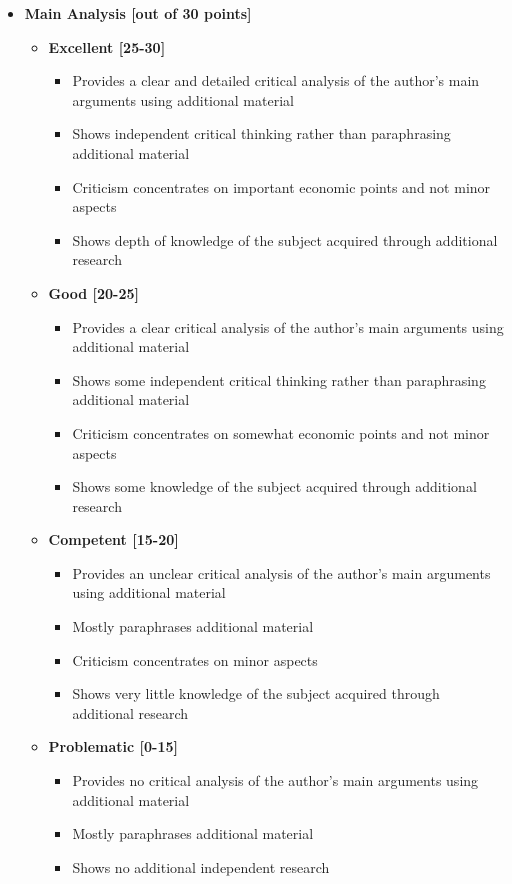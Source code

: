 \documentclass[letterpaper,12pt]{article}
\theoremstyle{dotlessS}
\begin{document}
\begin{itemize}
\item \textbf{Main Analysis [out of 30 points]}
\begin{itemize}
\item \textbf{Excellent [25-30]}
\begin{itemize}
\item Provides a clear and detailed critical analysis of the author's main arguments using additional material
\item Shows independent critical thinking rather than paraphrasing additional material    
\item Criticism concentrates on important economic points and not minor aspects
\item Shows depth of knowledge of the subject acquired through additional research
\end{itemize}
\item \textbf{Good [20-25]}
\begin{itemize}
\item Provides a clear critical analysis of the author's main arguments using additional material
\item Shows some independent critical thinking rather than paraphrasing additional material    
\item Criticism concentrates on somewhat economic points and not minor aspects
\item Shows some knowledge of the subject acquired through additional research
\end{itemize}
\item \textbf{Competent [15-20]}
\begin{itemize}
\item Provides an unclear critical analysis of the author's main arguments using additional material
\item Mostly paraphrases additional material    
\item Criticism concentrates on minor aspects
\item Shows very little knowledge of the subject acquired through additional research
\end{itemize}
\item \textbf{Problematic [0-15]}
\begin{itemize}
\item Provides no critical analysis of the author's main arguments using additional material
\item Mostly paraphrases additional material    
\item Shows no additional independent research
\end{itemize}
\end{itemize}


\end{itemize}
\end{document}
